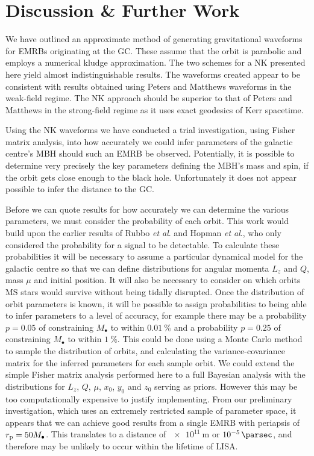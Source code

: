 \section{Discussion \& Further Work}

We have outlined an approximate method of generating gravitational waveforms for EMRBs originating at the GC. These assume that the orbit is parabolic and employs a numerical kludge approximation. The two schemes for a NK presented here yield almost indistinguishable results. The waveforms created appear to be consistent with results obtained using Peters and Matthews waveforms in the weak-field regime. The NK approach should be superior to that of Peters and Matthews in the strong-field regime as it uses exact geodesics of Kerr spacetime.

Using the NK waveforms we have conducted a trial investigation, using Fisher matrix analysis, into how accurately we could infer parameters of the galactic centre's MBH should such an EMRB be observed. Potentially, it is possible to determine very precisely the key parameters defining the MBH's mass and spin, if the orbit gets close enough to the black hole. Unfortunately it does not appear possible to infer the distance to the GC.

Before we can quote results for how accurately we can determine the various parameters, we must consider the probability of each orbit. This work would build upon the earlier results of Rubbo {\it et al}.\cite{Rubbo2006} and Hopman {\it et al}.\cite{Hopman2007}, who only considered the probability for a signal to be detectable. To calculate these probabilities it will be necessary to assume a particular dynamical model for the galactic centre so that we can define distributions for angular momenta $L_z$ and $Q$, mass $\mu$ and initial position. It will also be necessary to consider on which orbits MS stars would survive without being tidally disrupted\cite{Kobayashi2004}. Once the distribution of orbit parameters is known, it will be possible to assign probabilities to being able to infer parameters to a level of accuracy, for example there may be a probability $p = 0.05$ of constraining $M_\bullet$ to within $\SI{0.01}{\percent}$ and a probability $p = 0.25$ of constraining $M_\bullet$ to within $\SI{1}{\percent}$. This could be done using a Monte Carlo method to sample the distribution of orbits, and calculating the variance-covariance matrix for the inferred parameters for each sample orbit. We could extend the simple Fisher matrix analysis performed here to a full Bayesian analysis with the distributions for $L_z$, $Q$, $\mu$, $x_0$, $y_0$ and $z_0$ serving as priors. However this may be too computationally expensive to justify implementing. From our preliminary investigation, which uses an extremely restricted sample of parameter space, it appears that we can achieve good results from a single EMRB with periapsis of $r_\mathrm{p} = 50 M_\bullet$. This translates to a distance of $\SI{e11}{\metre}$ or $\SI{e-5}{\parsec}$, and therefore may be unlikely to occur within the lifetime of LISA.

